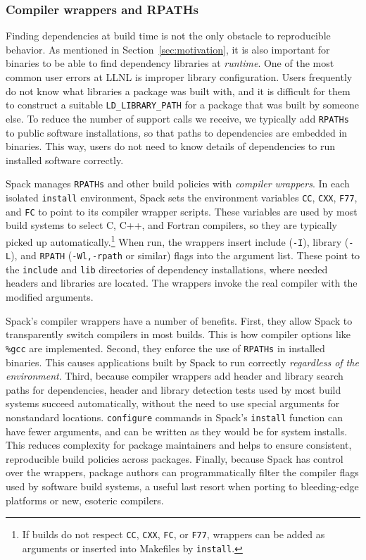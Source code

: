 \subsubsection{Compiler wrappers and RPATHs}
Finding dependencies at build time is not the only obstacle to reproducible
behavior.  As mentioned in Section~\ref{sec:motivation}, it is also important
for binaries to be able to find dependency libraries at {\it runtime}.
One of the most common user errors at LLNL is improper library configuration.
Users frequently do not know what libraries a package was built with, and
it is difficult for them to construct a suitable {\tt LD\_LIBRARY\_PATH} for
a package that was built by someone else.  To reduce the number of support calls
we receive,
we typically add {\tt RPATHs} to public software installations, so that paths
to dependencies are embedded in binaries. This way, users do not need to know
details of dependencies to run installed software correctly.

Spack manages {\tt RPATHs} and other build policies with
{\it compiler wrappers}.
In each isolated {\tt install} environment, Spack sets the environment variables
{\tt CC}, {\tt CXX}, {\tt F77}, and {\tt FC} to point to its compiler
wrapper scripts.  These variables are used by most build systems to select 
C, C++, and Fortran compilers, so they are typically picked up
automatically.\footnote{If builds do not respect {\tt CC}, {\tt CXX}, {\tt FC},
or {\tt F77},
wrappers can be added as arguments or inserted into Makefiles
by {\tt install}.}
When run, the wrappers insert include ({\tt -I}), library ({\tt -L}), and
{\tt RPATH} ({\tt -Wl,-rpath} or similar) flags into the argument list.
These point to the {\tt include} and {\tt lib} directories of dependency
installations, where needed headers and libraries are located.
The wrappers invoke the real compiler with the modified arguments.

Spack's compiler wrappers have a number of benefits.  First, they allow
Spack to transparently switch compilers in most builds.  This is how
compiler options like {\tt \%gcc} are implemented.  Second, they enforce the
use of {\tt RPATHs} in
installed binaries.  This causes applications built by Spack to run correctly
{\it regardless of the environment}.  Third, because compiler wrappers add
header and library search paths for dependencies, header and library detection
tests used by most build systems succeed automatically, without
the need to use special arguments for nonstandard locations.  {\tt configure}
commands in Spack's {\tt install} function can have fewer arguments, and can
be written as they would be for system installs.  This reduces complexity
for package maintainers and helps to ensure consistent, reproducible
build policies across packages.  Finally, because Spack has control over the
wrappers, package authors can programmatically filter the compiler flags
used by software build systems, a useful last resort when porting to
bleeding-edge platforms or new, esoteric compilers.

